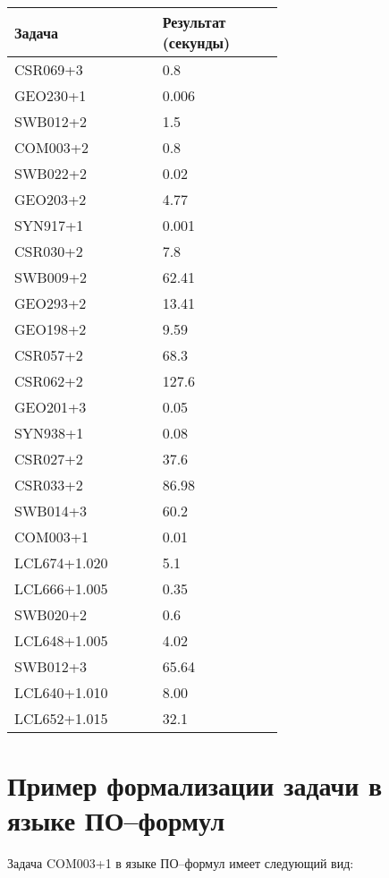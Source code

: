 \begin{longtable}[H]{|p{0.3\linewidth}|p{0.3\linewidth}|}
\hline
\textbf{Задача} & \textbf{Результат (секунды)} \\
\hline
CSR069+3 & 0.8  \\
\hline
GEO230+1 & 0.006  \\
\hline
SWB012+2 & 1.5  \\
\hline
COM003+2 & 0.8 \\
\hline
SWB022+2 & 0.02 \\
\hline
GEO203+2 & 4.77 \\
\hline
SYN917+1 & 0.001 \\
\hline
CSR030+2 & 7.8 \\
\hline
SWB009+2 & 62.41 \\
\hline
GEO293+2 & 13.41 \\
\hline
GEO198+2 & 9.59 \\
\hline
CSR057+2 & 68.3 \\
\hline
CSR062+2 & 127.6 \\
\hline
GEO201+3 & 0.05 \\
\hline
SYN938+1 & 0.08 \\
\hline
CSR027+2 & 37.6 \\
\hline
CSR033+2 & 86.98 \\
\hline
SWB014+3 & 60.2 \\
\hline
COM003+1 & 0.01 \\
\hline
LCL674+1.020 & 5.1 \\
\hline
LCL666+1.005 & 0.35 \\
\hline
SWB020+2 & 0.6 \\
\hline
LCL648+1.005 & 4.02 \\
\hline
SWB012+3 & 65.64 \\
\hline
LCL640+1.010 & 8.00 \\
\hline
LCL652+1.015 & 32.1 \\
\hline
\end{longtable}



\section*{Пример формализации задачи в языке ПО--формул}

Задача COM003+1 в языке ПО--формул имеет следующий вид:

